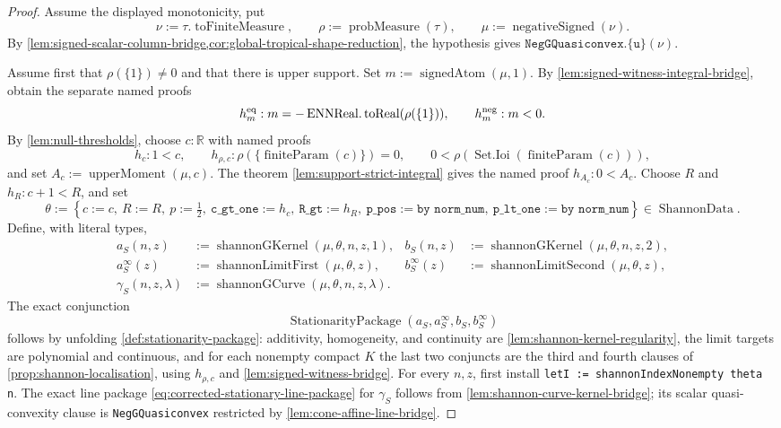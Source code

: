 \documentclass[9pt]{extarticle}
\theoremstyle{definition}
\theoremstyle{remark}
\newcommand{\R}{\mathbb R}
\begin{document}
\begin{proof}
Assume the displayed monotonicity, put
\[
 \nu:=\tau.\operatorname{toFiniteMeasure},
 \qquad
 \rho:=\operatorname{probMeasure}(\tau),
 \qquad
 \mu:=\operatorname{negativeSigned}(\nu).
\]
By
\cref{lem:signed-scalar-column-bridge,cor:global-tropical-shape-reduction},
the hypothesis gives $\texttt{NegGQuasiconvex.\{u\}}(\nu)$.

Assume first that $\rho(\{1\})\neq0$ and that there is upper support.  Set
$m:=\operatorname{signedAtom}(\mu,1)$.  By
\cref{lem:signed-witness-integral-bridge}, obtain the separate named proofs
\[
 h_m^{\rm eq}:m=-\operatorname{ENNReal.toReal}(\rho(\{1\})),
 \qquad h_m^{\rm neg}:m<0.
\]
By \cref{lem:null-thresholds}, choose $c:\R$ with named proofs
\[
 h_c:1<c,\qquad
 h_{\rho,c}:\rho(\{\operatorname{finiteParam}(c)\})=0,\qquad
 0<\rho(\operatorname{Set.Ioi}(\operatorname{finiteParam}(c))),
\]
and set $A_c:=\operatorname{upperMoment}(\mu,c)$.  The theorem
\cref{lem:support-strict-integral} gives the named proof $h_{A_c}:0<A_c$.
Choose $R$ and $h_R:c+1<R$, and set
\[
\theta:=
 \left\{c:=c,\ R:=R,\ p:=\tfrac12,\
 \texttt{c\_gt\_one}:=h_c,\ \texttt{R\_gt}:=h_R,\
 \texttt{p\_pos}:=\texttt{by norm\_num},\
 \texttt{p\_lt\_one}:=\texttt{by norm\_num}\right\}
 \in\operatorname{ShannonData}.
\]
Define, with literal types,
\begin{align*}
 a_S(n,z)&:=\operatorname{shannonGKernel}(\mu,\theta,n,z,1),&
 b_S(n,z)&:=\operatorname{shannonGKernel}(\mu,\theta,n,z,2),\\
 a_S^\infty(z)&:=\operatorname{shannonLimitFirst}(\mu,\theta,z),&
 b_S^\infty(z)&:=\operatorname{shannonLimitSecond}(\mu,\theta,z),\\
 \gamma_S(n,z,\lambda)&:=
   \operatorname{shannonGCurve}(\mu,\theta,n,z,\lambda).
\end{align*}
The exact conjunction
\[
 \operatorname{StationarityPackage}
  (a_S,a_S^\infty,b_S,b_S^\infty)
\]
follows by unfolding \cref{def:stationarity-package}: additivity,
homogeneity, and continuity are
\cref{lem:shannon-kernel-regularity}, the limit targets are polynomial and
continuous, and for each nonempty compact $K$ the last two conjuncts are the
third and fourth clauses of \cref{prop:shannon-localisation}, using
$h_{\rho,c}$ and \cref{lem:signed-witness-bridge}.
For every $n,z$, first install
\texttt{letI := shannonIndexNonempty theta n}.  The exact line package
\cref{eq:corrected-stationary-line-package} for $\gamma_S$ follows from
\cref{lem:shannon-curve-kernel-bridge}; its scalar quasi-convexity clause is
\texttt{NegGQuasiconvex} restricted by
\cref{lem:cone-affine-line-bridge}.


\end{proof}
\end{document}
